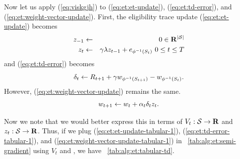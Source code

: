 Now let us apply (\ref{eq:viskgjh}) to (\ref{eq:et:et-update}), (\ref{eq:et:td-error}),
and (\ref{eq:et:weight-vector-update}).
First, the eligibility trace update (\ref{eq:et:et-update}) becomes
\begin{eqnarray}
\nonumber
z_{-1} &\leftarrow& 0 \in \mathbf{R}^{|\mathcal{S}|}
\\
z_{t} &\leftarrow& \gamma \lambda z_{t-1} + e_{\phi^{-1}(S_{t})}
\ 0 \leq t \leq T
\label{eq:et:et-update-tabular-1}
\end{eqnarray}
and (\ref{eq:et:td-error}) becomes
\begin{equation}
\label{eq:et:td-error-tabular-1}
\delta_{t} \leftarrow R_{t+1}
+ \gamma {w_{\ensuremath{\phi}^{-1}(\ensuremath{S_{t+1}})}}
- {w_{\phi^{-1}(S_{t})}}.
\end{equation}
However, (\ref{eq:et:weight-vector-update}) remains the same.
\begin{equation}
\label{eq:et:weight-vector-update-tabular-1}
{w_{t+1}} \leftarrow {w_{t}} + \alpha_{t} \delta_{t} z_{t}.
\end{equation}

Now we note that we would better express this in terms of $V_t: \mathcal{S} \to \mathbf{R}$ and $z_{t}: \mathcal{S} \to \mathbf{R}$.
Thus, if we plug (\ref{eq:et:et-update-tabular-1}), (\ref{eq:et:td-error-tabular-1}), and (\ref{eq:et:weight-vector-update-tabular-1}) in \tablename~\ref{tab:alg:et:semi-gradient} using $V_t$ and ,
we have \tablename~\ref{tab:alg:et:tabular-td}.


\newcommand{\tstate}{\tilde{\state{}}}
\newcommand{\taction}{\tilde{\action{}}}

